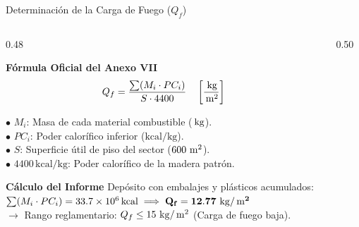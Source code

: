 \begin{frame}{Determinación de la Carga de Fuego ($Q_f$)}
  \begin{columns}[c]
    \begin{column}{0.48\textwidth}
      \begin{block}{\textbf{Fórmula Oficial del Anexo VII}}
        \begin{equation*}
          Q_f = \frac{\sum (M_i \cdot PC_i)}{S \cdot 4400} \quad \left[\frac{\,\mathrm{kg}}{\,\mathrm{m}^2}\right]
        \end{equation*}
      \end{block}
      \small
      $\bullet$ $M_i$: Masa de cada material combustible ($\,\mathrm{kg}$).\\
      $\bullet$ $PC_i$: Poder calorífico inferior ($\mathrm{kcal/kg}$).\\
      $\bullet$ $S$: Superficie útil de piso del sector ($600\,\,\mathrm{m}^2$).\\
      $\bullet$ $4400\,\mathrm{kcal/kg}$: Poder calorífico de la madera patrón.
      \vspace{0.12cm}
      \begin{alertblock}{\textbf{Cálculo del Informe}}
        \footnotesize Depósito con embalajes y plásticos acumulados:\\
        $\sum (M_i \cdot PC_i) = 33.7 \times 10^6\,\mathrm{kcal} \implies \mathbf{Q_f = 12.77\,\,\mathrm{kg}/\,\mathrm{m}^2}$\\
        $\rightarrow$ Rango reglamentario: \textbf{$Q_f \le 15\,\,\mathrm{kg}/\,\mathrm{m}^2$} (Carga de fuego baja).
      \end{alertblock}
    \end{column}

    \begin{column}{0.50\textwidth}
      \centering
\end{column}
\end{columns}
\end{frame}
